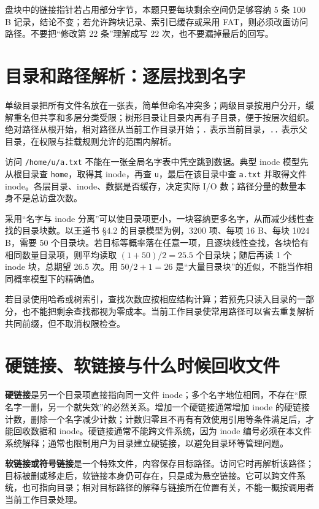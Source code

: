 盘块中的链接指针若占用部分字节，本题只要每块剩余空间仍足够容纳 5 条 100 B 记录，结论不变；若允许跨块记录、索引已缓存或采用 FAT，则必须改画访问路径。不要把``修改第 22 条''理解成写 22 次，也不要漏掉最后的回写。

\section{目录和路径解析：逐层找到名字}\label{os-6-6}

单级目录把所有文件名放在一张表，简单但命名冲突多；两级目录按用户分开，缓解重名但共享和多层分类受限；树形目录让目录内再有子目录，便于按层次组织。绝对路径从根开始，相对路径从当前工作目录开始；\texttt{.} 表示当前目录，\texttt{..} 表示父目录，在权限与挂载规则允许的范围内解析。

访问 \texttt{/home/u/a.txt} 不能在一张全局名字表中凭空跳到数据。典型 inode 模型先从根目录查 \texttt{home}，取得其 inode，再查 \texttt{u}，最后在该目录中查 \texttt{a.txt} 并取得文件 inode。各层目录、inode、数据是否缓存，决定实际 I/O 数；路径分量的数量本身不是总访盘次数。

采用``名字与 inode 分离''可以使目录项更小，一块容纳更多名字，从而减少线性查找的目录块数。以王道书 §4.2 的目录模型为例，3200 项、每项 16 B、每块 1024 B，需要 50 个目录块。若目标等概率落在任意一项，且逐块线性查找，各块恰有相同数量目录项，则平均读取 \((1+50)/2=25.5\) 个目录块；随后再读 1 个 inode 块，总期望 26.5 次。用 \(50/2+1=26\) 是``大量目录块''的近似，不能当作相同概率模型下的精确值。

若目录使用哈希或树索引，查找次数应按相应结构计算；若预先只读入目录的一部分，也不能把剩余查找都视为零成本。当前工作目录使常用路径可以省去重复解析共同前缀，但不取消权限检查。

\section{硬链接、软链接与什么时候回收文件}\label{os-6-7}

\textbf{硬链接}是另一个目录项直接指向同一文件 inode；多个名字地位相同，不存在``原名字一删，另一个就失效''的必然关系。增加一个硬链接通常增加 inode 的硬链接计数，删除一个名字减少计数；计数归零且不再有有效使用引用等条件满足后，才能回收数据和 inode。硬链接通常不能跨文件系统，因为 inode 编号必须在本文件系统解释；通常也限制用户为目录建立硬链接，以避免目录环等管理问题。

\textbf{软链接或符号链接}是一个特殊文件，内容保存目标路径。访问它时再解析该路径；目标被删或移走后，软链接本身仍可存在，只是成为悬空链接。它可以跨文件系统，也可指向目录；相对目标路径的解释与链接所在位置有关，不能一概按调用者当前工作目录处理。


